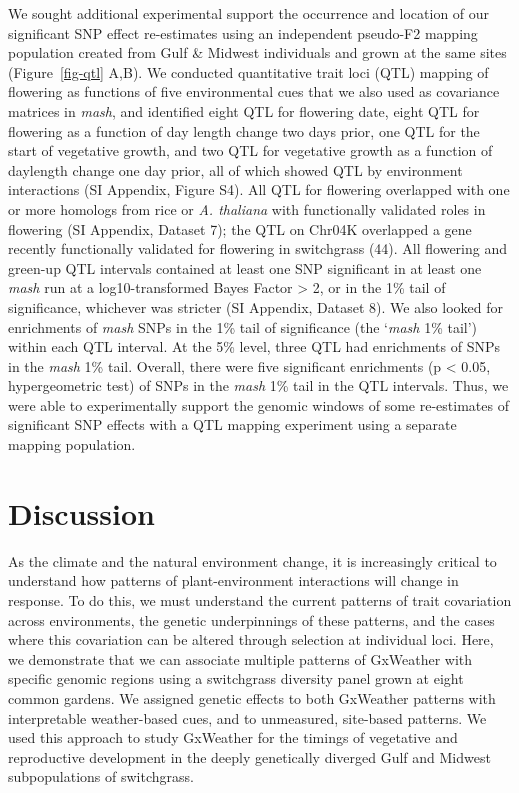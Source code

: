 \documentclass[
  9pt,
  twocolumn,
  twoside]{pnas-new}
\begin{document}
We sought additional experimental support the occurrence and location of
our significant SNP effect re-estimates using an independent pseudo-F2
mapping population created from Gulf \& Midwest individuals and grown at
the same sites (Figure~\ref{fig-qtl} A,B). We conducted quantitative
trait loci (QTL) mapping of flowering as functions of five environmental
cues that we also used as covariance matrices in \emph{mash}, and
identified eight QTL for flowering date, eight QTL for flowering as a
function of day length change two days prior, one QTL for the start of
vegetative growth, and two QTL for vegetative growth as a function of
daylength change one day prior, all of which showed QTL by environment
interactions (SI Appendix, Figure S4). All QTL for flowering overlapped
with one or more homologs from rice or \emph{A. thaliana} with
functionally validated roles in flowering (SI Appendix, Dataset 7); the
QTL on Chr04K overlapped a gene recently functionally validated for
flowering in switchgrass (44). All flowering and green-up QTL intervals
contained at least one SNP significant in at least one \emph{mash} run
at a log10-transformed Bayes Factor \textgreater{} 2, or in the 1\% tail
of significance, whichever was stricter (SI Appendix, Dataset 8). We
also looked for enrichments of \emph{mash} SNPs in the 1\% tail of
significance (the `\emph{mash} 1\% tail') within each QTL interval. At
the 5\% level, three QTL had enrichments of SNPs in the \emph{mash} 1\%
tail. Overall, there were five significant enrichments (p \textless{}
0.05, hypergeometric test) of SNPs in the \emph{mash} 1\% tail in the
QTL intervals. Thus, we were able to experimentally support the genomic
windows of some re-estimates of significant SNP effects with a QTL
mapping experiment using a separate mapping population.

\section{Discussion}\label{discussion}

As the climate and the natural environment change, it is increasingly
critical to understand how patterns of plant-environment interactions
will change in response. To do this, we must understand the current
patterns of trait covariation across environments, the genetic
underpinnings of these patterns, and the cases where this covariation
can be altered through selection at individual loci. Here, we
demonstrate that we can associate multiple patterns of GxWeather with
specific genomic regions using a switchgrass diversity panel grown at
eight common gardens. We assigned genetic effects to both GxWeather
patterns with interpretable weather-based cues, and to unmeasured,
site-based patterns. We used this approach to study GxWeather for the
timings of vegetative and reproductive development in the deeply
genetically diverged Gulf and Midwest subpopulations of switchgrass.
\end{document}
